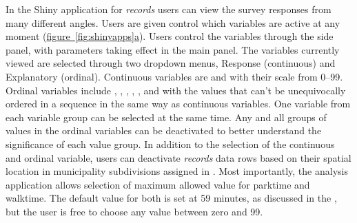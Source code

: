 In the Shiny application for \textit{records} users can view the survey responses from many different angles. Users are given control which variables are active at any moment (\hyperref[fig:shinyapps]{figure~\ref{fig:shinyapps}a}). Users control the variables through the side panel, with parameters taking effect in the main panel. The variables currently viewed are selected through two dropdown menus, Response (continuous) and Explanatory (ordinal). Continuous variables are  and  with their scale from 0--99. Ordinal variables include , , , , , and  with the values that can't be unequivocally ordered in a sequence in the same way as continuous variables. One variable from each variable group can be selected at the same time. Any and all groups of values in the ordinal variables can be deactivated to better understand the significance of each value group. In addition to the selection of the continuous and ordinal variable, users can deactivate \textit{records} data rows based on their spatial location in municipality subdivisions assigned in \hyperref[sec:processdata]{}. Most importantly, the analysis application allows selection of maximum allowed value for parktime and walktime. The default value for both is set at 59 minutes, as discussed in the , but the user is free to choose any value between zero and 99.

